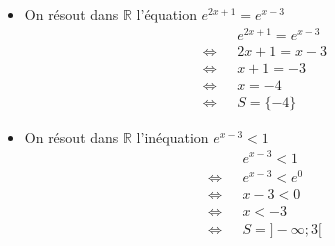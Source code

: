 \documentclass[11pt,a4paper]{article}
\begin{document}
\begin{minipage}{0.5\textwidth}
    \begin{itemize}
        \item On résout dans $\mathbb{R}$ l'équation $e^{2x+1}=e^{x-3}$
        \begin{align*}
            &e^{2x+1}=e^{x-3} \\
            \Leftrightarrow\text{ }&2x+1=x-3 \\
            \Leftrightarrow\text{ }&x+1=-3 \\
            \Leftrightarrow\text{ }&x=-4 \\
            \Leftrightarrow\text{ }&S=\{-4\}
        \end{align*}
    \end{itemize}
\end{minipage}
\hfill
\begin{minipage}{0.5\textwidth}
    \begin{itemize}
        \item On résout dans $\mathbb{R}$ l'inéquation $e^{x-3}<1$
        \begin{align*}
            &e^{x-3}<1 \\
            \Leftrightarrow\text{ }&e^{x-3}<e^0 \\
            \Leftrightarrow\text{ }&x-3<0 \\
            \Leftrightarrow\text{ }&x<-3 \\
            \Leftrightarrow\text{ }&S=]-\infty;3[
        \end{align*}
    \end{itemize}
\end{minipage}
\end{document}

